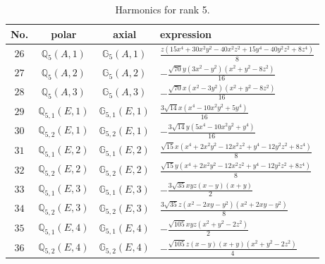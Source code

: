 \documentclass[fleqn,8pt,landscape]{jsarticle}
\begin{document}
\begin{table}[ht!]
\begin{center}
\caption{Harmonics for rank 5.}
\renewcommand{\arraystretch}{1.3}
\begin{tabular}{cccl} \hline \hline
No. & polar & axial & expression \\ \hline
$ 26 $ & $ \mathbb{Q}_{5}(A,1) $ & $ \mathbb{G}_{5}(A,1) $ & $ \frac{z \left(15 x^{4} + 30 x^{2} y^{2} - 40 x^{2} z^{2} + 15 y^{4} - 40 y^{2} z^{2} + 8 z^{4}\right)}{8} $ \\
$ 27 $ & $ \mathbb{Q}_{5}(A,2) $ & $ \mathbb{G}_{5}(A,2) $ & $ - \frac{\sqrt{70} y \left(3 x^{2} - y^{2}\right) \left(x^{2} + y^{2} - 8 z^{2}\right)}{16} $ \\
$ 28 $ & $ \mathbb{Q}_{5}(A,3) $ & $ \mathbb{G}_{5}(A,3) $ & $ - \frac{\sqrt{70} x \left(x^{2} - 3 y^{2}\right) \left(x^{2} + y^{2} - 8 z^{2}\right)}{16} $ \\
$ 29 $ & $ \mathbb{Q}_{5,1}(E,1) $ & $ \mathbb{G}_{5,1}(E,1) $ & $ \frac{3 \sqrt{14} x \left(x^{4} - 10 x^{2} y^{2} + 5 y^{4}\right)}{16} $ \\
$ 30 $ & $ \mathbb{Q}_{5,2}(E,1) $ & $ \mathbb{G}_{5,2}(E,1) $ & $ - \frac{3 \sqrt{14} y \left(5 x^{4} - 10 x^{2} y^{2} + y^{4}\right)}{16} $ \\
$ 31 $ & $ \mathbb{Q}_{5,1}(E,2) $ & $ \mathbb{G}_{5,1}(E,2) $ & $ \frac{\sqrt{15} x \left(x^{4} + 2 x^{2} y^{2} - 12 x^{2} z^{2} + y^{4} - 12 y^{2} z^{2} + 8 z^{4}\right)}{8} $ \\
$ 32 $ & $ \mathbb{Q}_{5,2}(E,2) $ & $ \mathbb{G}_{5,2}(E,2) $ & $ \frac{\sqrt{15} y \left(x^{4} + 2 x^{2} y^{2} - 12 x^{2} z^{2} + y^{4} - 12 y^{2} z^{2} + 8 z^{4}\right)}{8} $ \\
$ 33 $ & $ \mathbb{Q}_{5,1}(E,3) $ & $ \mathbb{G}_{5,1}(E,3) $ & $ - \frac{3 \sqrt{35} x y z \left(x - y\right) \left(x + y\right)}{2} $ \\
$ 34 $ & $ \mathbb{Q}_{5,2}(E,3) $ & $ \mathbb{G}_{5,2}(E,3) $ & $ \frac{3 \sqrt{35} z \left(x^{2} - 2 x y - y^{2}\right) \left(x^{2} + 2 x y - y^{2}\right)}{8} $ \\
$ 35 $ & $ \mathbb{Q}_{5,1}(E,4) $ & $ \mathbb{G}_{5,1}(E,4) $ & $ - \frac{\sqrt{105} x y z \left(x^{2} + y^{2} - 2 z^{2}\right)}{2} $ \\
$ 36 $ & $ \mathbb{Q}_{5,2}(E,4) $ & $ \mathbb{G}_{5,2}(E,4) $ & $ - \frac{\sqrt{105} z \left(x - y\right) \left(x + y\right) \left(x^{2} + y^{2} - 2 z^{2}\right)}{4} $ \\
 \hline \hline
\end{tabular}
\end{center}
\end{table}
\end{document}
